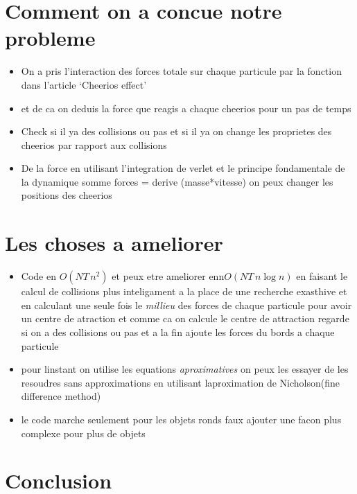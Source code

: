 \documentclass[a4paper, 11pt, oneside]{article} %
\begin{document}
\section{Comment on a concue notre probleme}
    \begin{itemize}
        \item On a pris l'interaction des forces totale sur chaque particule par la fonction dans l'article `Cheerios effect'
        \item et de ca on deduis la force que reagis a chaque cheerios pour un pas de temps 
        \item Check si il ya des collisions ou pas et si il ya on change les proprietes des cheerios par rapport aux collisions
        \item De la force en utilisant l'integration de verlet et le principe fondamentale de la dynamique somme forces = derive (masse*vitesse) on peux changer les positions des cheerios
    \end{itemize}
    
\section{Les choses a ameliorer}
    \begin{itemize}
        \item Code en $O(NT\,n^2)$ et peux etre ameliorer enn$O(NT\, n\log n)$ en faisant le calcul de collisions plus inteligament a la place de une recherche exasthive et en calculant une seule fois le \textit{millieu} des forces de chaque particule pour avoir un centre de atraction et comme ca on calcule le centre de attraction regarde si on a des collisions ou pas et a la fin ajoute les forces du bords a chaque particule
        \item pour linstant on utilise les equations \textit{aproximatives} on peux les essayer de les resoudres sans approximations en utilisant laproximation de Nicholson(fine difference method)
        \item le code marche seulement pour les objets ronds faux ajouter une facon plus complexe pour plus de objets
    \end{itemize}
\section*{Conclusion}

\newpage
\thispagestyle{empty}
\nocite{*}
\printbibliography[title = Bibliographie]
\end{document}
